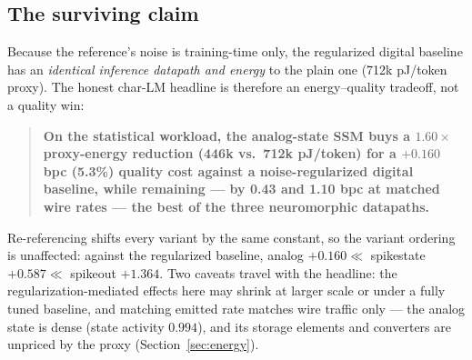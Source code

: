 \subsection{The surviving claim}
\label{sec:charlm-claim}

Because the reference's noise is training-time only, the regularized digital baseline has an
\emph{identical inference datapath and energy} to the plain one (712k pJ/token proxy). The
honest char-LM headline is therefore an energy--quality tradeoff, not a quality win:

\begin{quote}
\textbf{On the statistical workload, the analog-state SSM buys a $1.60\times$ proxy-energy
reduction (446k vs.\ 712k pJ/token) for a $+0.160$ bpc (5.3\%) quality cost against a
noise-regularized digital baseline, while remaining --- by 0.43 and 1.10 bpc at matched wire
rates --- the best of the three neuromorphic datapaths.}
\end{quote}

Re-referencing shifts every variant by the same constant, so the variant ordering is
unaffected: against the regularized baseline, analog $+0.160 \ll$ spikestate $+0.587 \ll$
spikeout $+1.364$. Two caveats travel with the headline: the regularization-mediated effects
here may shrink at larger scale or under a fully tuned baseline, and matching emitted rate
matches wire traffic only --- the analog state is dense (state activity $0.994$), and its
storage elements and converters are unpriced by the proxy (Section~\ref{sec:energy}).
